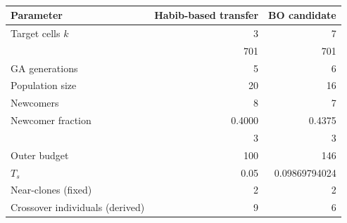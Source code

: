 \begin{table}[htbp]
\centering\small
\caption[Transferred configuration and frozen BO candidate]{}
\label{tab:b-candidate}
\begingroup{}
\setlength{\tabcolsep}{3.5pt}
\begin{tabularx}{\linewidth}{@{}Y r r@{}}
\toprule
Parameter & Habib-based transfer & BO candidate \\
\midrule
Target cells $k$ & 3 & 7 \\
 & 701 & 701 \\
GA generations & 5 & 6 \\
Population size & 20 & 16 \\
Newcomers & 8 & 7 \\
Newcomer fraction & 0.4000 & 0.4375 \\
 & 3 & 3 \\
Outer budget & 100 & 146 \\
$T_s$ & 0.05 & 0.09869794024 \\
Near-clones (fixed) & 2 & 2 \\
Crossover individuals (derived) & 9 & 6 \\
\bottomrule
\end{tabularx}\endgroup
\par\smallskip\footnotesize{}
\end{table}
